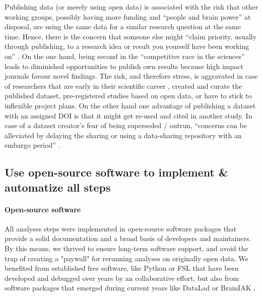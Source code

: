 %
Publishing data (or merely using open data) is associated with the risk that
other working groups, possibly having more funding and ``people and brain
power'' at disposal, are using the same data for a similar research question at
the same time.
%
Hence, there is the concern that someone else might ``claim priority, usually
through publishing, to a research idea or result you yourself have been working
on'' \citep{laine2017afraid}.
%
On the one hand, being second in the ``competitive race in the sciences'' leads
to diminished opportunities to publish own results because high impact journals
favour novel findings.
%
The risk, and therefore stress, is aggravated in case of researchers that are
early in their scientific career \citep[cf.][]{toribio2021early}, created and
curate the published dataset, pre-registered studies based on open data, or have
to stick to inflexible project plans.
%
On the other hand one advantage of publishing a dataset with an assigned DOI is
that it might get re-used and cited in another study.
%
In case of a dataset creator's fear of being superseded / outrun, ``concerns can
be alleviated by delaying the sharing or using a data-sharing repository with an
embargo period'' \citep{nichols2017best}.



\subsection{Use open-source software to implement \& automatize all steps}

\paragraph{Open-source software}

All analyses steps were implemented in open-source software packages that
provide a solid documentation and a broad basis of developers and maintainers.
%
By this means, we thrived to ensure long-term software support, and avoid the
trap of creating a "paywall" for rerunning analyses on originally open data.
%
We benefited from established free software, like Python or FSL
\citep[\href{https://www.fmrib.ox.ac.uk/fsl}{FMRIB's Software
Library;}][]{smith2004fsl} that have been developed and debugged over years by
an collaborative effort,
%
but also from software packages that emerged during current years like
%
DataLad
\citep[\href{www.datalad.org}{\url{datalad.org}};][]{halchenko2021datalad} or
%
BrainIAK
\citep[\href{https://brainiak.org}{\url{brainiak.org}};][]{kumar2020brainiak,
kumar2020brainiaktutorial}.


